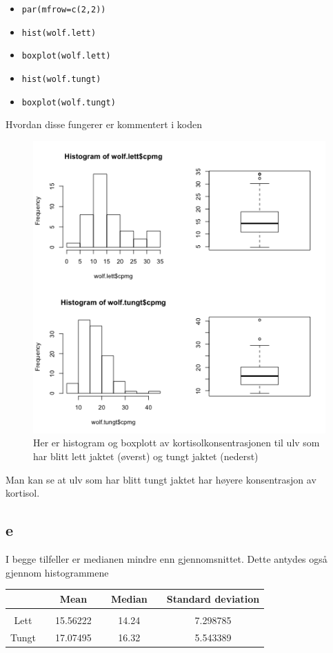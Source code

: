 \begin{itemize}
    \item \texttt{par(mfrow=c(2,2))}
    \item \texttt{hist(wolf.lett)}
    \item \texttt{boxplot(wolf.lett)}
    \item \texttt{hist(wolf.tungt)}
    \item \texttt{boxplot(wolf.tungt)}
\end{itemize}
Hvordan disse fungerer er kommentert i koden
\begin{figure}[H]
		\centering
		\includegraphics[width=0.9\linewidth]{wolf_sammenlign.pdf}
		\caption{Her er histogram og boxplott av kortisolkonsentrasjonen til ulv som har blitt lett jaktet (øverst) og tungt jaktet (nederst)}
		\label{fig:sammenlign}
\end{figure}
Man kan se at ulv som har blitt tungt jaktet har høyere konsentrasjon av kortisol.

\subsection*{e}

I begge tilfeller er medianen mindre enn gjennomsnittet. Dette antydes også gjennom histogrammene

\begin{center}
\label{tab:mean_median_standard}
\begin{tabularx}{\textwidth}{c X c X c X c }
    \hline
    \hline
         && Mean && Median && Standard deviation \\
    \hline
    \\
        Lett   	&&     15.56222      &&      14.24      &&     7.298785       \\
        Tungt   &&     17.07495      &&      16.32      &&      5.543389       \\
    \hline
\end{tabularx}
\end{center}


